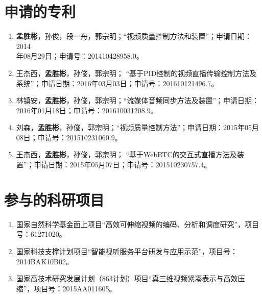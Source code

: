 \section*{申请的专利}
\begin{enumerate}
	\item \textbf{孟胜彬}，孙俊，段一舟，郭宗明；“视频质量控制方法和装置”；申请日期：2014\\年08月29日；申请号：201410428958.0。
	\item 王杰西，\textbf{孟胜彬}，孙俊，郭宗明； “基于PID控制的视频直播传输控制方法及系统”；申请日期：2016年03月03日；申请号：201610121496.7。
	\item 林镇安，\textbf{孟胜彬}，孙俊，郭宗明；“流媒体音频同步方法及装置”；申请日期：2016年01月18日；申请号：201610031208.9。
	\item 刘森，\textbf{孟胜彬}，孙俊，郭宗明；“视频质量控制方法”；申请日期：2015年05月08日；申请号：201510231060.9。
	\item 王杰西，\textbf{孟胜彬}，孙俊，郭宗明； “基于WebRTC的交互式直播方法及装置”；申请日期：2015年05月07日；申请号：201510230757.4。
\end{enumerate}

\section*{参与的科研项目}
\begin{enumerate}
	\item 国家自然科学基金面上项目“高效可伸缩视频的编码、分析和调度研究”，项目号：61271020。
	\item 国家科技支撑计划项目“智能视听服务平台研发与应用示范”，项目号：\\2014BAK10B02。
	\item 国家高技术研究发展计划（863计划）项目“真三维视频紧凑表示与高效压缩”，项目号：2015AA011605。
\end{enumerate}